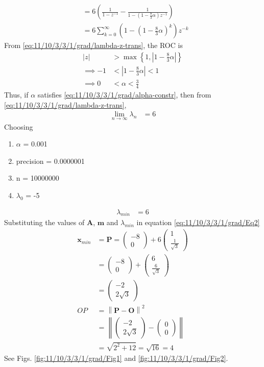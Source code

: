 \documentclass[12pt]{article}
\providecommand{\brak}[1]{\ensuremath{\left(#1\right)}}
\providecommand{\norm}[1]{\left\lVert#1\right\rVert}
\providecommand{\cbrak}[1]{\ensuremath{\left\{#1\right\}}}
\providecommand{\abs}[1]{\left\vert#1\right\vert}
\newcommand{\myvec}[1]{\ensuremath{\begin{pmatrix}#1\end{pmatrix}}}
\let\vec\mathbf
\begin{document}
\begin{enumerate}
\begin{align}
	    &= 6\brak{ \frac{1}{1-z^{-1}} - \frac{1}{1-\brak{1-\frac{8}{3}\alpha}z^{-1}}} \\
            \label{eq:11/10/3/3/1/grad/lambda-z-trans}
	    &= 6\sum_{k=0}^{\infty}\brak{1-\brak{1-\frac{8}{3}\alpha}^k}z^{-k}
\end{align}
From \eqref{eq:11/10/3/3/1/grad/lambda-z-trans}, the ROC is
\begin{align}
	\abs{z} &> \max\cbrak{1,\abs{1-\frac{8}{3}\alpha}} \\
	\implies -1 & < \abs{1-\frac{8}{3}\alpha} < 1 \\
        \label{eq:11/10/3/3/1/grad/alpha-constr}
        \implies 0 &< \alpha < \frac{3}{4}
\end{align}
Thus, if $\alpha$ satisfies \eqref{eq:11/10/3/3/1/grad/alpha-constr}, then from \eqref{eq:11/10/3/3/1/grad/lambda-z-trans}, 
\begin{align}
	\label{eq:11/10/3/3/1/grad/conv}
        \lim_{n\to\infty}\lambda_n &= 6 
    \end{align}
Choosing
\begin{enumerate}
 \item $\alpha$ = 0.001
 \item precision = 0.0000001
 \item n = 10000000 
 \item $\lambda_0$ = -5 
\end{enumerate}
\begin{align}
	\lambda_{min} &= 6 
\end{align}
Substituting the values of $\vec{A}$, $\vec{m}$ and $\lambda_{min}$ in equation \eqref{eq:11/10/3/3/1/grad/Eq2} 
\begin{align}
	\vec{x}_{min} &= \vec{P} = \myvec{-8 \\ 0}+6\myvec{1 \\ \frac{1}{\sqrt{3}}}  \\
	&= \myvec{-8 \\ 0}+\myvec{6 \\ \frac{6}{\sqrt{3}}} \\
	&= \myvec{-2 \\ 2\sqrt{3}} \\
	OP &= \norm{\vec{P}-\vec{O}}^2 \\ 
	&= \norm{\myvec{-2 \\ 2\sqrt{3}}-\myvec{0 \\ 0}} \\
	&= \sqrt{2^2 + 12} = \sqrt{16} = 4
\end{align}
See Figs. \ref{fig:11/10/3/3/1/grad/Fig1} and \ref{fig:11/10/3/3/1/grad/Fig2}.

\end{enumerate}
\end{document}
